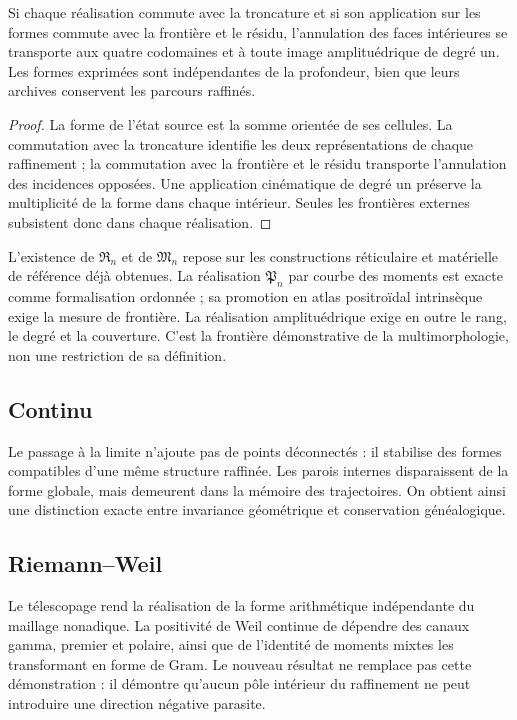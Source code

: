 \begin{proposition}
\label{geometria_positiva:prop:coherencia-multimorfologica} Si chaque réalisation commute avec la troncature et si son application sur les formes commute avec la frontière et le résidu, l’annulation des faces intérieures se transporte aux quatre codomaines et à toute image amplituédrique de degré un. Les formes exprimées sont indépendantes de la profondeur, bien que leurs archives conservent les parcours raffinés.
\end{proposition}
\begin{proof}
La forme de l’état source est la somme orientée de ses cellules. La commutation avec la troncature identifie les deux représentations de chaque raffinement ; la commutation avec la frontière et le résidu transporte l’annulation des incidences opposées. Une application cinématique de degré un préserve la multiplicité de la forme dans chaque intérieur. Seules les frontières externes subsistent donc dans chaque réalisation.
\end{proof}

L’existence de \(\mathfrak R_n\) et de \(\mathfrak M_n\) repose sur les constructions réticulaire et matérielle de référence déjà obtenues. La réalisation \(\mathfrak P_n\) par courbe des moments est exacte comme formalisation ordonnée ; sa promotion en atlas positroïdal intrinsèque exige la mesure de frontière. La réalisation amplituédrique exige en outre le rang, le degré et la couverture. C’est la frontière démonstrative de la multimorphologie, non une restriction de sa définition.

\subsection{Continu}

Le passage à la limite n’ajoute pas de points déconnectés : il stabilise des formes compatibles d’une même structure raffinée. Les parois internes disparaissent de la forme globale, mais demeurent dans la mémoire des trajectoires. On obtient ainsi une distinction exacte entre invariance géométrique et conservation généalogique.

\subsection{Riemann--Weil}

Le télescopage rend la réalisation de la forme arithmétique indépendante du maillage nonadique. La positivité de Weil continue de dépendre des canaux gamma, premier et polaire, ainsi que de l’identité de moments mixtes les transformant en forme de Gram. Le nouveau résultat ne remplace pas cette démonstration : il démontre qu’aucun pôle intérieur du raffinement ne peut introduire une direction négative parasite.

